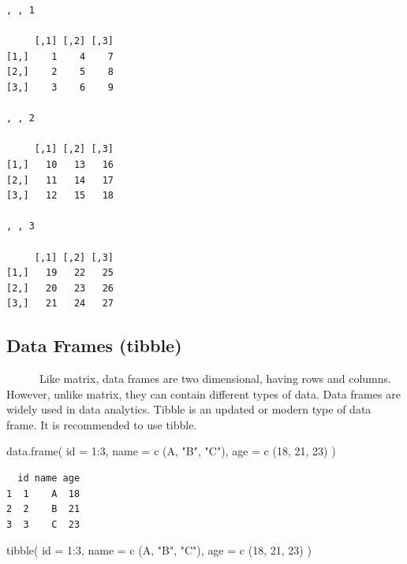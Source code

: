 \documentclass[
  letterpaper,
  DIV=11,
  numbers=noendperiod]{scrreprt}
\newenvironment{Shaded}{\begin{snugshade}}{\end{snugshade}}
\newcommand{\AttributeTok}[1]{\textcolor[rgb]{0.40,0.45,0.13}{#1}}
\newcommand{\DecValTok}[1]{\textcolor[rgb]{0.68,0.00,0.00}{#1}}
\newcommand{\FunctionTok}[1]{\textcolor[rgb]{0.28,0.35,0.67}{#1}}
\newcommand{\NormalTok}[1]{\textcolor[rgb]{0.00,0.23,0.31}{#1}}
\newcommand{\SpecialCharTok}[1]{\textcolor[rgb]{0.37,0.37,0.37}{#1}}
\newcommand{\StringTok}[1]{\textcolor[rgb]{0.13,0.47,0.30}{#1}}
\begin{document}
\begin{verbatim}
, , 1

     [,1] [,2] [,3]
[1,]    1    4    7
[2,]    2    5    8
[3,]    3    6    9

, , 2

     [,1] [,2] [,3]
[1,]   10   13   16
[2,]   11   14   17
[3,]   12   15   18

, , 3

     [,1] [,2] [,3]
[1,]   19   22   25
[2,]   20   23   26
[3,]   21   24   27
\end{verbatim}

\subsection{Data Frames (tibble)}\label{data-frames-tibble}

~~~~~~Like matrix, data frames are two dimensional, having rows and
columns. However, unlike matrix, they can contain different types of
data. Data frames are widely used in data analytics. Tibble is an
updated or modern type of data frame. It is recommended to use tibble.

\begin{Shaded}
\begin{Highlighting}[]
\FunctionTok{data.frame}\NormalTok{(}
    \AttributeTok{id =} \DecValTok{1}\SpecialCharTok{:}\DecValTok{3}\NormalTok{,}
    \AttributeTok{name =} \FunctionTok{c}\NormalTok{ (}\StringTok{\textquotesingle{}A\textquotesingle{}}\NormalTok{, }\StringTok{"B"}\NormalTok{, }\StringTok{"C"}\NormalTok{),}
    \AttributeTok{age =} \FunctionTok{c}\NormalTok{ (}\DecValTok{18}\NormalTok{, }\DecValTok{21}\NormalTok{, }\DecValTok{23}\NormalTok{)}
\NormalTok{)}
\end{Highlighting}
\end{Shaded}

\begin{verbatim}
  id name age
1  1    A  18
2  2    B  21
3  3    C  23
\end{verbatim}

\begin{Shaded}
\begin{Highlighting}[]
\FunctionTok{tibble}\NormalTok{(}
   \AttributeTok{id =} \DecValTok{1}\SpecialCharTok{:}\DecValTok{3}\NormalTok{,}
    \AttributeTok{name =} \FunctionTok{c}\NormalTok{ (}\StringTok{\textquotesingle{}A\textquotesingle{}}\NormalTok{, }\StringTok{"B"}\NormalTok{, }\StringTok{"C"}\NormalTok{),}
    \AttributeTok{age =} \FunctionTok{c}\NormalTok{ (}\DecValTok{18}\NormalTok{, }\DecValTok{21}\NormalTok{, }\DecValTok{23}\NormalTok{) }
\NormalTok{)}
\end{Highlighting}
\end{Shaded}
\end{document}
